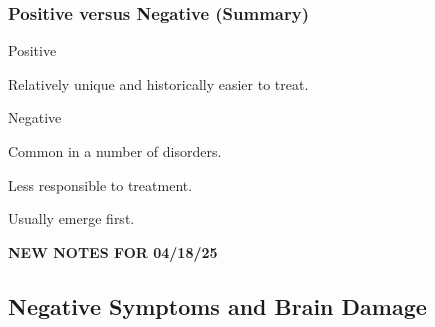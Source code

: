 \subsubsection{Positive versus Negative (Summary)}

\begin{coloredlist}
    \item Positive
    \begin{coloredlist}
        \item Relatively unique and historically easier to treat.
    \end{coloredlist}
    \item Negative
    \begin{coloredlist}
        \item Common in a number of disorders.
        \item Less responsible to treatment.
        \item Usually emerge first.
    \end{coloredlist}
\end{coloredlist}

\begin{center}
    \textbf{NEW NOTES FOR 04/18/25} \\
    \hrulefill
\end{center}

\subsection{Negative Symptoms and Brain Damage}

